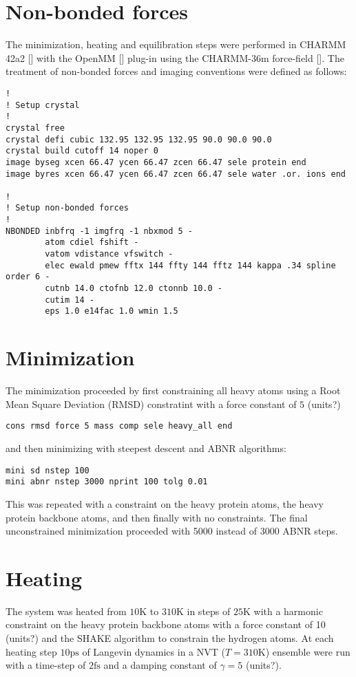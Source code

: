 \section{Non-bonded forces}
The minimization, heating and equilibration steps were performed in CHARMM 42a2 [] with the OpenMM [] plug-in using the CHARMM-36m force-field []. The treatment of non-bonded forces and imaging conventions were defined as follows:
\begin{lstlisting}
!
! Setup crystal
!
crystal free
crystal defi cubic 132.95 132.95 132.95 90.0 90.0 90.0
crystal build cutoff 14 noper 0
image byseg xcen 66.47 ycen 66.47 zcen 66.47 sele protein end
image byres xcen 66.47 ycen 66.47 zcen 66.47 sele water .or. ions end

!
! Setup non-bonded forces
!
NBONDED inbfrq -1 imgfrq -1 nbxmod 5 -                      
        atom cdiel fshift - 
        vatom vdistance vfswitch -
        elec ewald pmew fftx 144 ffty 144 fftz 144 kappa .34 spline order 6 -    
        cutnb 14.0 ctofnb 12.0 ctonnb 10.0 -      
        cutim 14 -
        eps 1.0 e14fac 1.0 wmin 1.5                     
\end{lstlisting}

\section{Minimization}
The minimization proceeded by first constraining all heavy atoms  using a Root Mean Square Deviation (RMSD) constratint with a force constant of $5$ (units?)

\begin{lstlisting}
cons rmsd force 5 mass comp sele heavy_all end
\end{lstlisting}
and then minimizing with steepest descent and ABNR algorithms: 
\begin{lstlisting}
mini sd nstep 100
mini abnr nstep 3000 nprint 100 tolg 0.01
\end{lstlisting}
This was repeated with a constraint on the heavy protein atoms, the heavy protein backbone atoms, and then finally with no constraints. The final unconstrained minimization proceeded with 5000 instead of 3000 ABNR steps. 

\section{Heating}
The system was heated from $10\mathrm{K}$ to $310\mathrm{K}$ in steps of $25\mathrm{K}$ with a harmonic constraint on the heavy protein backbone atoms with a force constant of 10 (units?) and the SHAKE algorithm to constrain the hydrogen atoms. At each heating step $10\mathrm{ps}$ of Langevin dynamics in a NVT ($T=310\mathrm{K}$) ensemble were run with a time-step of $2\mathrm{fs}$ and a damping constant of $\gamma=5$ (units?). 

